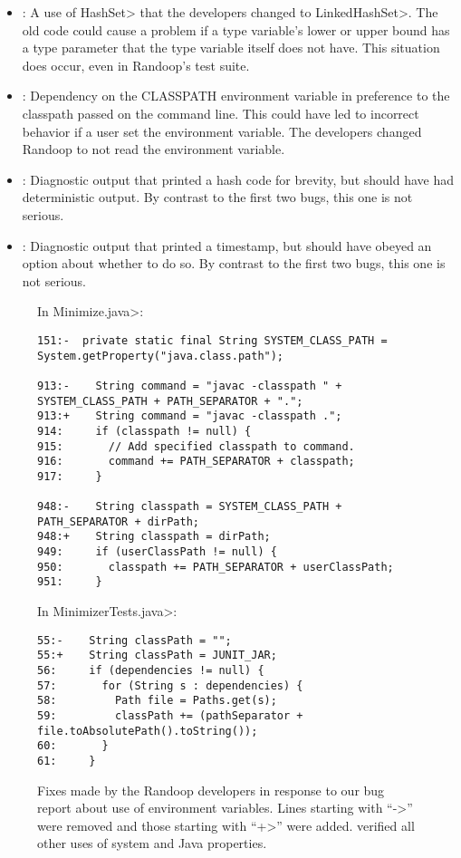 \begin{itemize}
\item \bugOne:
  A use of \<HashSet> that the developers changed to \<LinkedHashSet>.
The old code could cause a problem if a type variable's lower or upper
bound has a type parameter that the type variable itself does not have.
This situation does occur, even in Randoop's test suite.

\item \bugTwo:
Dependency on the CLASSPATH environment variable in preference to the
classpath passed on the command line.
This could have led to incorrect behavior if a user set the environment variable.
The developers changed Randoop to not read the environment variable.

\item \bugThree:
Diagnostic output that printed a hash code for brevity, but should have had
deterministic output.  By contrast to the first two bugs,
this one is not serious.

\item \bugFour:
Diagnostic output that printed a timestamp, but should have obeyed an
option about whether to do so.  By contrast to the first
two bugs, this one is not serious.

\end{itemize}

\begin{figure}

\noindent
In \<Minimize.java>:

\begin{Verbatim}
151:-  private static final String SYSTEM_CLASS_PATH = System.getProperty("java.class.path");

913:-    String command = "javac -classpath " + SYSTEM_CLASS_PATH + PATH_SEPARATOR + ".";
913:+    String command = "javac -classpath .";
914:     if (classpath != null) {
915:       // Add specified classpath to command.
916:       command += PATH_SEPARATOR + classpath;
917:     }

948:-    String classpath = SYSTEM_CLASS_PATH + PATH_SEPARATOR + dirPath;
948:+    String classpath = dirPath;
949:     if (userClassPath != null) {
950:       classpath += PATH_SEPARATOR + userClassPath;
951:     }
\end{Verbatim}

\noindent
In \<MinimizerTests.java>:

\begin{Verbatim}
55:-    String classPath = "";
55:+    String classPath = JUNIT_JAR;
56:     if (dependencies != null) {
57:       for (String s : dependencies) {
58:         Path file = Paths.get(s);
59:         classPath += (pathSeparator + file.toAbsolutePath().toString());
60:       }
61:     }
\end{Verbatim}

\caption{Fixes made by the Randoop developers in response to our bug report
  about use of environment variables.  Lines starting with ``\<->'' were
  removed and those starting with ``\<+>'' were added.
  \TheDeterminismChecker verified all other uses of system and Java properties.}
\label{fig:randoop-bug-getenv}
\end{figure}


